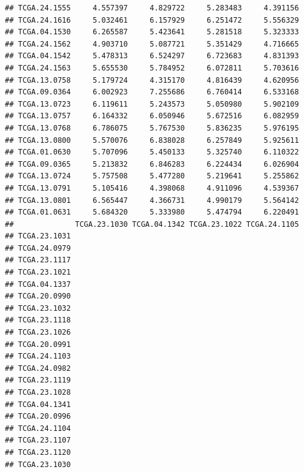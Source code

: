 \documentclass[UTF8]{beamer}\usepackage[]{graphicx}\usepackage[]{color}
\makeatletter
\newenvironment{kframe}{%
 \def\at@end@of@kframe{}%
 \ifinner\ifhmode%
  \def\at@end@of@kframe{\end{minipage}}%
  \begin{minipage}{\columnwidth}%
 \fi\fi%
 \def\FrameCommand##1{\hskip\@totalleftmargin \hskip-\fboxsep
 \colorbox{shadecolor}{##1}\hskip-\fboxsep
     \hskip-\linewidth \hskip-\@totalleftmargin \hskip\columnwidth}%
 \MakeFramed {\advance\hsize-\width
   \@totalleftmargin\z@ \linewidth\hsize
   \@setminipage}}%
 {\par\unskip\endMakeFramed%
 \at@end@of@kframe}
\newenvironment{knitrout}{}{} %
\makeatother
\begin{document}
\begin{frame}[fragile]
\begin{knitrout}
\begin{kframe}
\begin{verbatim}
## TCGA.24.1555     4.557397     4.829722     5.283483     4.391156
## TCGA.24.1616     5.032461     6.157929     6.251472     5.556329
## TCGA.04.1530     6.265587     5.423641     5.281518     5.323333
## TCGA.24.1562     4.903710     5.087721     5.351429     4.716665
## TCGA.04.1542     5.478313     6.524297     6.723683     4.831393
## TCGA.24.1563     5.655530     5.784952     6.072811     5.703616
## TCGA.13.0758     5.179724     4.315170     4.816439     4.620956
## TCGA.09.0364     6.002923     7.255686     6.760414     6.533168
## TCGA.13.0723     6.119611     5.243573     5.050980     5.902109
## TCGA.13.0757     6.164332     6.050946     5.672516     6.082959
## TCGA.13.0768     6.786075     5.767530     5.836235     5.976195
## TCGA.13.0800     5.570076     6.838028     6.257849     5.925611
## TCGA.01.0630     5.707096     5.450133     5.325740     6.110322
## TCGA.09.0365     5.213832     6.846283     6.224434     6.026904
## TCGA.13.0724     5.757508     5.477280     5.219641     5.255862
## TCGA.13.0791     5.105416     4.398068     4.911096     4.539367
## TCGA.13.0801     6.565447     4.366731     4.990179     5.564142
## TCGA.01.0631     5.684320     5.333980     5.474794     6.220491
##              TCGA.23.1030 TCGA.04.1342 TCGA.23.1022 TCGA.24.1105
## TCGA.23.1031                                                    
## TCGA.24.0979                                                    
## TCGA.23.1117                                                    
## TCGA.23.1021                                                    
## TCGA.04.1337                                                    
## TCGA.20.0990                                                    
## TCGA.23.1032                                                    
## TCGA.23.1118                                                    
## TCGA.23.1026                                                    
## TCGA.20.0991                                                    
## TCGA.24.1103                                                    
## TCGA.24.0982                                                    
## TCGA.23.1119                                                    
## TCGA.23.1028                                                    
## TCGA.04.1341                                                    
## TCGA.20.0996                                                    
## TCGA.24.1104                                                    
## TCGA.23.1107                                                    
## TCGA.23.1120                                                    
## TCGA.23.1030                                                    

\end{verbatim}
\end{kframe}
\end{knitrout}
\end{frame}
\end{document}
